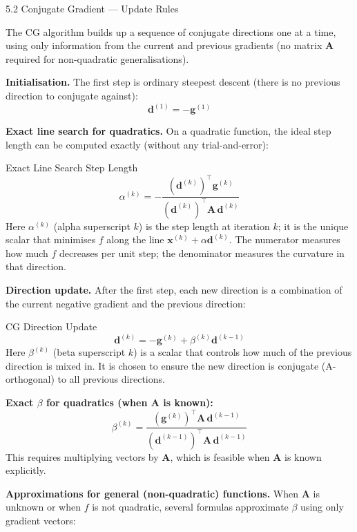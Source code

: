 \documentclass[aspectratio=169,10pt]{beamer}
\newcommand{\vx}{\mathbf{x}}
\newcommand{\vg}{\mathbf{g}}
\newcommand{\vd}{\mathbf{d}}
\newcommand{\mA}{\mathbf{A}}
\begin{document}
\begin{frame}[allowframebreaks]{5.2 Conjugate Gradient --- Update Rules}

  The CG algorithm builds up a sequence of conjugate directions
  one at a time, using only information from the current and
  previous gradients (no matrix $\mA$ required for non-quadratic
  generalisations).

  \vspace{0.5em}
  \textbf{Initialisation.}  The first step is ordinary steepest
  descent (there is no previous direction to conjugate against):
  \[
    \vd^{(1)} = -\vg^{(1)}
  \]

  \textbf{Exact line search for quadratics.}  On a quadratic
  function, the ideal step length can be computed exactly
  (without any trial-and-error):
  \begin{block}{Exact Line Search Step Length}
    \[
      \alpha^{(k)} = -\frac{(\vd^{(k)})^\top \vg^{(k)}}
                           {(\vd^{(k)})^\top \mA\,\vd^{(k)}}
    \]
    Here $\alpha^{(k)}$ (alpha superscript $k$) is the step
    length at iteration $k$; it is the unique scalar that
    minimises $f$ along the line $\vx^{(k)} + \alpha\vd^{(k)}$.
    The numerator measures how much $f$ decreases per unit step;
    the denominator measures the curvature in that direction.
  \end{block}

  \textbf{Direction update.}  After the first step, each new
  direction is a combination of the current negative gradient
  and the previous direction:
  \begin{block}{CG Direction Update}
    \[
      \vd^{(k)} = -\vg^{(k)} + \beta^{(k)}\vd^{(k-1)}
    \]
    Here $\beta^{(k)}$ (beta superscript $k$) is a scalar that
    controls how much of the previous direction is mixed in.
    It is chosen to ensure the new direction is conjugate
    (A-orthogonal) to all previous directions.
  \end{block}

  \framebreak

  \textbf{Exact $\beta$ for quadratics (when $\mA$ is known):}
  \[
    \beta^{(k)} = \frac{(\vg^{(k)})^\top \mA\,\vd^{(k-1)}}
                       {(\vd^{(k-1)})^\top \mA\,\vd^{(k-1)}}
  \]
  This requires multiplying vectors by $\mA$, which is
  feasible when $\mA$ is known explicitly.

  \vspace{0.5em}
  \textbf{Approximations for general (non-quadratic) functions.}
  When $\mA$ is unknown or when $f$ is not quadratic, several
  formulas approximate $\beta$ using only gradient vectors:


\end{frame}
\end{document}
